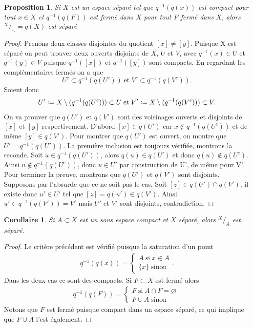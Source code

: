 \documentclass[12pt]{book}
\newcommand{\defeq}{\vcentcolon=}
\newtheorem{cor}[lemma]{Corollaire}
\newtheorem{prop}[lemma]{Proposition}
\theoremstyle{definition}
\theoremstyle{remark}
\newcommand*\quot[2]{{^{\textstyle #1}\big/_{\textstyle #2}}}
\begin{document}
	\begin{prop}
		Si $X$ est un espace séparé tel que $q^{-1}(q(x))$ est compact pour tout  $x\in X$ et $q^{-1}(q(F))$ est fermé dans $X$ pour tout F fermé dans $X$, alors $\quot{X}{\sim} = q(X)$ est séparé
	\end{prop}
	\begin{proof}
		Prenons deux classes disjointes du quotient $[x] \neq [y]$. Puisque X est séparé on peut trouver deux ouverts disjoints de $X$, $U$ et $V$, avec $q^{-1}(x) \in U$ et  $q^{-1}(y) \in V$ puisque $q^{-1}([x])$ et  $q^{-1}([y])$ sont compacts. En regardant les complémentaires fermés on a que \[
			U^c \subset q^{-1}(q(U^c)) \; \text{et} \; V^c \subset q^{-1}(q(V^c))
		.\] Soient donc \[
		U' \defeq X\setminus(q^{-1}(q(U^c))) \subset U \; \text{et} \; V' \defeq X\setminus(q^{-1}(q(V^c))) \subset V
	.\]  On va prouver que $q(U')$ et  $q(V')$ sont des voisinages ouverts et disjoints de $[x]$ et $[y]$ respectivement. 
	D'abord $[x] \in q(U')$ car  $x \not\in q^{-1}(q(U^c))$ et de même  $[y] \in q(V')$. Pour montrer que $q(U')$ est ouvert, on montre que  $U' = q^{-1}(q(U'))$. La première inclusion est toujours vérifiée, montrons la seconde. Soit $u \in q^{-1}(q(U'))$, alors $q(u) \in q(U')$ et donc $q(u) \not\in q(U^c)$. Ainsi  $u \not\in q^{-1}(q(U^c))$, donc $u \in U'$ par construction de U', de même pour V'. \\
	Pour terminer la preuve, montrons que $q(U')$ et  $q(V')$ sont disjoints. Supposons par l'absurde que ce ne soit pas le cas. Soit $[z] \in q(U')\cap q(V')$, il existe donc $u' \in U'$ tel que  $[z] = q(u') \in q(V')$. Ainsi $u' \in q^{-1}(q(V')) = V'$ mais  $U'$ et  $V'$ sont disjoints, contradiction.
	\end{proof}
	\begin{cor}
		Si $A \subset X$ est un sous espace compact et $X$ séparé, alors $\quot{X}{A}$ est séparé.
	\end{cor}
	\begin{proof}
		Le critère précédent est vérifié puisque la saturation d'un point
		\begin{align*}
			q^{-1}(q(x)) = \begin{cases}
				A \; \text{si} \; x \in A \\
				\{x\} \; \text{sinon} 
			\end{cases}
		.\end{align*} Dans les deux cas ce sont des compacts.
		Si $F \subset X$ est fermé alors 
		\begin{align*}
			q^{-1}(q(F)) = \begin{cases}
				F \; \text{si} \; A\cap F = \varnothing \\
				F \cup A \; \text{sinon}
			\end{cases}
		.\end{align*} Notons que $F$ est fermé puisque compact dans un espace séparé, ce qui implique que  $F \cup A$ l'est également.
	\end{proof}
\end{document}
